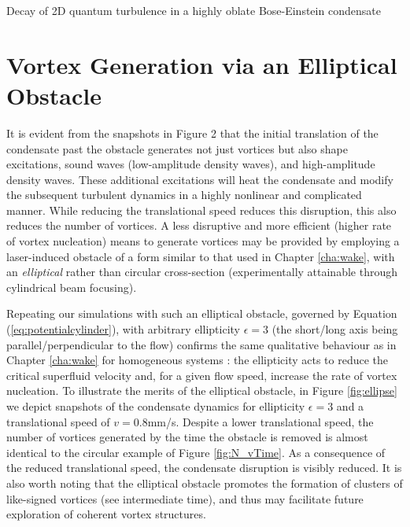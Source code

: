 \begin{chapter}{\label{cha:shin}Decay of 2D quantum turbulence in a highly oblate Bose-Einstein condensate}
\section{Vortex Generation via an Elliptical Obstacle}
It is evident from the snapshots in Figure 2 that the initial translation of the condensate past the obstacle generates not just vortices but also shape excitations, sound waves (low-amplitude density waves), and high-amplitude density waves.  These additional excitations will heat the condensate and modify the subsequent turbulent dynamics in a highly nonlinear and complicated manner.  While reducing the translational speed reduces this disruption, this also reduces the number of vortices.  A less disruptive and more efficient (higher rate of vortex nucleation) means to generate vortices may be provided by employing a laser-induced obstacle of a form similar to that used in Chapter \ref{cha:wake}, with an {\it elliptical} rather than circular cross-section (experimentally attainable through cylindrical beam focusing).

Repeating our simulations with such an elliptical obstacle, governed by Equation (\ref{eq:potentialcylinder}), with arbitrary ellipticity $\epsilon=3$ (the short/long axis being parallel/perpendicular to the flow) confirms the same qualitative behaviour as in Chapter \ref{cha:wake} for homogeneous systems \citep{stagg_parker_14}: the ellipticity acts to reduce the critical superfluid velocity and, for a given flow speed, increase the rate of vortex nucleation. To illustrate the merits of the elliptical obstacle, in Figure \ref{fig:ellipse} we depict snapshots of the condensate dynamics for ellipticity $\epsilon=3$ and a translational speed of $v=0.8$mm/s. Despite a lower translational speed, the number of vortices generated by the time the obstacle is removed is almost identical to the circular example of Figure \ref{fig:N_vTime}.  As a consequence of the reduced translational speed, the condensate disruption is visibly reduced. It is also worth noting that the elliptical obstacle promotes the formation of clusters of like-signed vortices (see intermediate time), and thus may facilitate future exploration of coherent vortex structures.



\end{chapter}
